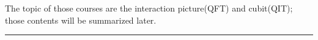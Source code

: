 The topic of those courses are the interaction picture(QFT) and cubit(QIT); those contents will be summarized later.

\noindent\rule{\textwidth}{1pt}
\newline